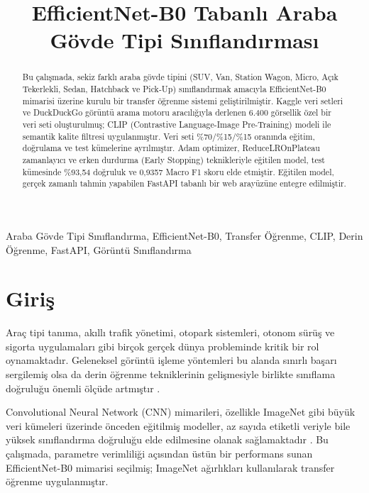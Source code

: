 \documentclass[conference]{IEEEtran}
\title{EfficientNet-B0 Tabanlı Araba Gövde Tipi Sınıflandırması}
\author{
  \IEEEauthorblockN{Barışcan Özgen}
  \IEEEauthorblockA{
    Bilgisayar Mühendisliği Bölümü\\
    Kocaeli Üniversitesi\\
    Kocaeli, Türkiye\\
    230201057}
}
\begin{document}
\maketitle

\begin{abstract}
Bu çalışmada, sekiz farklı araba gövde tipini (SUV, Van, Station Wagon, Micro,
Açık Tekerlekli, Sedan, Hatchback ve Pick-Up) sınıflandırmak amacıyla
EfficientNet-B0 mimarisi üzerine kurulu bir transfer öğrenme sistemi
geliştirilmiştir. Kaggle veri setleri ve DuckDuckGo görüntü arama motoru
aracılığıyla derlenen 6.400 görsellik özel bir veri seti oluşturulmuş;
CLIP (Contrastive Language-Image Pre-Training) modeli ile semantik kalite
filtresi uygulanmıştır. Veri seti \%70/\%15/\%15 oranında eğitim, doğrulama
ve test kümelerine ayrılmıştır. Adam optimizer, ReduceLROnPlateau zamanlayıcı
ve erken durdurma (Early Stopping) teknikleriyle eğitilen model, test kümesinde
\%93,54 doğruluk ve 0,9357 Macro F1 skoru elde etmiştir. Eğitilen model,
gerçek zamanlı tahmin yapabilen FastAPI tabanlı bir web arayüzüne entegre
edilmiştir.
\end{abstract}

\begin{IEEEkeywords}
Araba Gövde Tipi Sınıflandırma, EfficientNet-B0, Transfer Öğrenme,
CLIP, Derin Öğrenme, FastAPI, Görüntü Sınıflandırma
\end{IEEEkeywords}

\section{Giriş}

Araç tipi tanıma, akıllı trafik yönetimi, otopark sistemleri, otonom sürüş
ve sigorta uygulamaları gibi birçok gerçek dünya probleminde kritik bir rol
oynamaktadır. Geleneksel görüntü işleme yöntemleri bu alanda sınırlı başarı
sergilemiş olsa da derin öğrenme tekniklerinin gelişmesiyle birlikte sınıflama
doğruluğu önemli ölçüde artmıştır \cite{lecun2015deep}.

Convolutional Neural Network (CNN) mimarileri, özellikle ImageNet gibi büyük
veri kümeleri üzerinde önceden eğitilmiş modeller, az sayıda etiketli veriyle
bile yüksek sınıflandırma doğruluğu elde edilmesine olanak sağlamaktadır
\cite{tan2019efficientnet}. Bu çalışmada, parametre verimliliği açısından
üstün bir performans sunan EfficientNet-B0 mimarisi seçilmiş; ImageNet
ağırlıkları kullanılarak transfer öğrenme uygulanmıştır.
\end{document}

